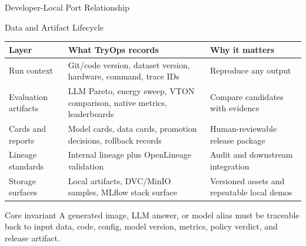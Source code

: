 \documentclass[aspectratio=169,10pt]{beamer}
\newcommand{\source}[1]{%
}
\begin{document}
\begin{frame}{Developer-Local Port Relationship}
\end{frame}

\begin{frame}{Data and Artifact Lifecycle}
  \scriptsize
  \renewcommand{\arraystretch}{1.13}
  \begin{tabularx}{\textwidth}{>{\RaggedRight\arraybackslash}p{3.1cm} Y >{\RaggedRight\arraybackslash}p{3.7cm}}
    \toprule
    \textbf{Layer} & \textbf{What TryOps records} & \textbf{Why it matters} \\
    \midrule
    Run context & Git/code version, dataset version, hardware, command, trace IDs & Reproduce any output \\
    \addlinespace
    Evaluation artifacts & LLM Pareto, energy sweep, VTON comparison, native metrics, leaderboards & Compare candidates with evidence \\
    \addlinespace
    Cards and reports & Model cards, data cards, promotion decisions, rollback records & Human-reviewable release package \\
    \addlinespace
    Lineage standards & Internal lineage plus OpenLineage validation & Audit and downstream integration \\
    \addlinespace
    Storage surfaces & Local artifacts, DVC/MinIO samples, MLflow stack surface & Versioned assets and repeatable local demos \\
    \bottomrule
  \end{tabularx}

  \vspace{0.22cm}
  \begin{alertblock}{Core invariant}
    A generated image, LLM answer, or model alias must be traceable back to input data, code, config, model version, metrics, policy verdict, and release artifact.
  \end{alertblock}
  \source{\texttt{docs/data\_versioning.md}; \texttt{docs/reproducibility\_checklist.md}; \texttt{docs/roadmap\_audit.md}.}
\end{frame}
\end{document}
